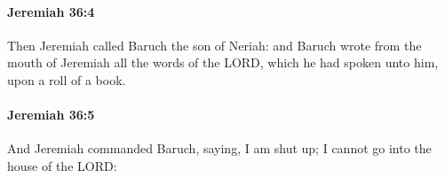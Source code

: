 		\paragraph{Jeremiah 36:4} %
			\label{JEREMIAH-36-4}

			Then Jeremiah called Baruch the son of Neriah: and Baruch wrote from the mouth of Jeremiah all the words of the LORD, which he had spoken unto him, upon a roll of a book.


		\paragraph{Jeremiah 36:5} %
			\label{JEREMIAH-36-5}

			And Jeremiah commanded Baruch, saying, I am shut up; I cannot go into the house of the LORD:


